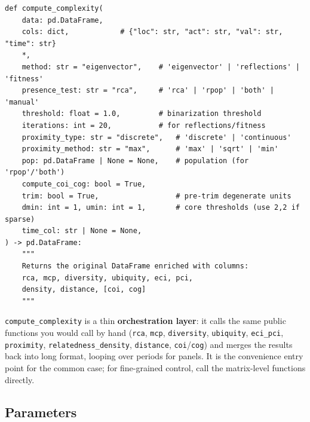 \documentclass[12pt, a4paper]{article}
\newcommand{\fn}[1]{\texttt{#1}}
\begin{document}
\begin{lstlisting}[caption={Pipeline function signature}]
def compute_complexity(
    data: pd.DataFrame,
    cols: dict,            # {"loc": str, "act": str, "val": str, "time": str}
    *,
    method: str = "eigenvector",    # 'eigenvector' | 'reflections' | 'fitness'
    presence_test: str = "rca",     # 'rca' | 'rpop' | 'both' | 'manual'
    threshold: float = 1.0,         # binarization threshold
    iterations: int = 20,           # for reflections/fitness
    proximity_type: str = "discrete",   # 'discrete' | 'continuous'
    proximity_method: str = "max",      # 'max' | 'sqrt' | 'min'
    pop: pd.DataFrame | None = None,    # population (for 'rpop'/'both')
    compute_coi_cog: bool = True,
    trim: bool = True,                  # pre-trim degenerate units
    dmin: int = 1, umin: int = 1,       # core thresholds (use 2,2 if sparse)
    time_col: str | None = None,
) -> pd.DataFrame:
    """
    Returns the original DataFrame enriched with columns:
    rca, mcp, diversity, ubiquity, eci, pci,
    density, distance, [coi, cog]
    """
\end{lstlisting}

\begin{notebox}
  \texttt{compute\_complexity} is a thin \textbf{orchestration layer}: it
  calls the same public functions you would call by hand (\fn{rca},
  \fn{mcp}, \fn{diversity}, \fn{ubiquity}, \fn{eci\_pci}, \fn{proximity},
  \fn{relatedness\_density}, \fn{distance}, \fn{coi}/\fn{cog}) and merges
  the results back into long format, looping over periods for panels. It
  is the convenience entry point for the common case; for fine-grained
  control, call the matrix-level functions directly.
\end{notebox}

\subsection{Parameters}
\end{document}
